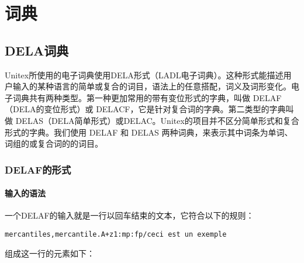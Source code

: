 \chapter{词典}
\label{chap-dictionaries}

\section{DELA词典}

Unitex所使用的电子词典使用DELA形式（LADL电子词典）。这种形式能描述用户输入的某种语言的简单或复合的词目，语法上的任意搭配，词义及词形变化。电子词典共有两种类型。第一种更加常用的带有变位形式的字典，叫做 DELAF（DELA的变位形式）或 DELACF，它是针对复合词的字典。第二类型的字典叫做 DELAS（DELA简单形式）或DELAC。Unitex的项目并不区分简单形式和复合形式的字典。我们使用 DELAF 和 DELAS 两种词典，来表示其中词条为单词、词组的或复合词的的词目。 

\subsection{DELAF的形式}
\label{section-DELAF-format}
\subsubsection{输入的语法}
\label{section-DELAF-entry-syntax}
一个DELAF的输入就是一行以回车结束的文本，它符合以下的规则：

\bigskip
\begin{verbatim}
mercantiles,mercantile.A+z1:mp:fp/ceci est un exemple
\end{verbatim}

\bigskip
\noindent 组成这一行的元素如下：

